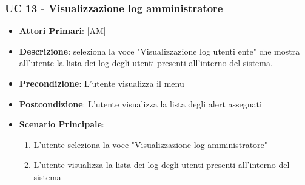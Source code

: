 		\subsubsection{UC 13 - Visualizzazione log amministratore}
		\begin{itemize}
			\item \textbf{Attori Primari}: [AM]
			\item \textbf{Descrizione}: seleziona la voce "Visualizzazione log utenti ente" che mostra all'utente la lista dei log degli utenti presenti all'interno del sistema.
			\item \textbf{Precondizione}: L'utente visualizza il menu
			\item \textbf{Postcondizione}: L'utente visualizza la lista degli alert assegnati
			\item \textbf{Scenario Principale}:
			\begin{enumerate}
				\item{L'utente seleziona la voce "Visualizzazione log amministratore"}
				\item{L'utente visualizza la lista dei log degli utenti presenti all'interno del sistema}
			\end{enumerate}	
		\end{itemize}
		






